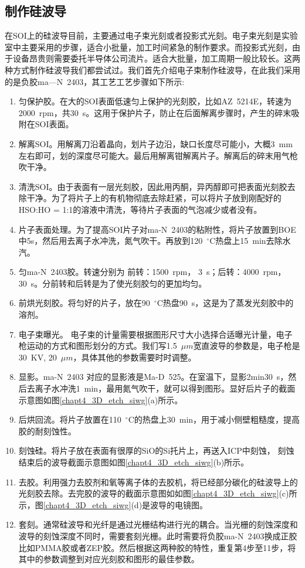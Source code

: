 \subsection{制作硅波导}
在SOI上的硅波导目前，主要通过电子束光刻或者投影式光刻。电子束光刻是实验室中主要采用的步骤，适合小批量，加工时间紧急的制作要求。而投影式光刻，由于设备昂贵则需要委托半导体公司流片。适合大批量，加工周期一般比较长。这两种方式制作硅波导我们都尝试过。我们首先介绍电子束制作硅波导，在此我们采用的是负胶ma—N~2403，其工艺工艺步骤如下所示:
\begin{enumerate}[(1)]
	\item 匀保护胶。在大的SOI表面低速匀上保护的光刻胶，比如AZ~5214E，转速为2000~rpm，共30~s。这用于保护片子，防止在后面解离步骤时，产生的碎末吸附在SOI表面。
	\item 解离SOI。用解离刀沿着晶向，划片子边沿，缺口长度尽可能小，大概3~mm左右即可，划的深度尽可能大。最后用解离钳解离片子。解离后的碎末用气枪吹干净。
	\item 清洗SOI。由于表面有一层光刻胶，因此用丙酮，异丙醇即可把表面光刻胶去除干净。为了将片子上的有机物彻底去除赶紧，可以将片子放到刚配好的HSO:HO = 1:1的溶液中清洗，等待片子表面的气泡减少或者没有。
	\item 片子表面处理。为了提高SOI片子对ma-N~2403的粘附性，将片子放置到BOE中5s，然后用去离子水冲洗，氮气吹干。再放到120~$^{\circ}$C热盘上15~min去除水汽。
	\item 匀ma-N~2403胶。转速分别为 前转：1500~rpm， 3~s；后转：4000~rpm，30~s。分前转和后转是为了使光刻胶匀的更加均匀。
	\item 前烘光刻胶。将匀好的片子，放在90~$^{\circ}$C热盘90~s，这是为了蒸发光刻胶中的溶剂。
	\item 电子束曝光。 电子束的计量需要根据图形尺寸大小选择合适曝光计量，电子枪运动的方式和图形划分的方式。我们写1.5~$\mu m$宽直波导的参数是，电子枪是30~KV, 20~$\mu m$，具体其他的参数需要时时调整。
	\item 显影。ma-N~2403 对应的显影液是Ma-D~525。在室温下，显影2min30~s，然后去离子水冲洗1~min，最用氮气吹干，就可以得到图形。显好后片子的截面示意图如图\ref{chapt4_3D_etch_siwg}(a)所示。
	\item 后烘回流。将片子放置在110~$^{\circ}$C的热盘上30~min，用于减小侧壁粗糙度，提高胶的耐刻蚀性。
	\item 刻蚀硅。将片子放在表面有很厚的SiO的Si托片上，再送入ICP中刻蚀， 刻蚀结束后的波导截面示意图如图\ref{chapt4_3D_etch_siwg}(b)所示。
	\item 去胶。利用强力去胶剂和氧等离子体的去胶机，将已经部分碳化的硅波导上的光刻胶去除。去完胶的波导的截面示意图如如图\ref{chapt4_3D_etch_siwg}(c)所示，图\ref{chapt4_3D_etch_siwg}(d)是波导的电镜图。
	\item 套刻。通常硅波导和光纤是通过光栅结构进行光的耦合。当光栅的刻蚀深度和波导的刻蚀深度不同时，需要套刻光栅。此时需要将负胶ma-N~2403换成正胶比如PMMA胶或者ZEP胶。然后根据这两种胶的特性，重复第4步至11步，将其中的参数调整到对应光刻胶和图形的最佳参数。
\end{enumerate}

